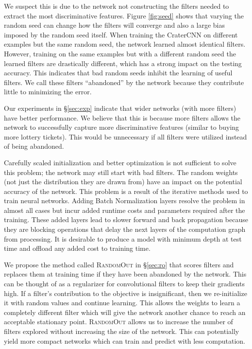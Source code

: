 \documentclass{article}
\begin{document}
We suspect this is due to the network not constructing the filters needed to extract the most discriminative features. Figure \ref{fig:seed} shows that varying the random seed can change how the filters will converge and also a large bias imposed by the random seed itself. When training the CraterCNN on different examples but the same random seed, the network learned almost identical filters. However, training on the same examples but with a different random seed the learned filters are drastically different, which has a strong impact on the testing accuracy.  This indicates that bad random seeds inhibit the learning of useful filters.  We call these filters ``abandoned'' by the network because they contribute little to minimizing the error. 


Our experiments in \S \ref{sec:exp} indicate that wider networks (with more filters) have better performance. We believe that this is because more filters allows the network to successfully capture more discriminative features (similar to buying more lottery tickets). This would be unnecessary if all filters were utilized instead of being abandoned.
	
	


Carefully scaled initialization \cite{glorot_understanding_2010} and better optimization is not sufficient to solve this problem; the network may still start with bad filters. The random weights (not just the distribution they are drawn from) have an impact on the potential accuracy of the network. This problem is a result of the iterative methods used to train neural networks. Adding Batch Normalization \cite{Ioffe2015} layers resolve the problem in almost all cases but incur added runtime costs and parameters required after the training. These added layers lead to slower forward and back propagation because they are blocking operations that delay the next layers of the computation graph from processing. It is desirable to produce a model with minimum depth at test time and offload any added cost to training time.

We propose the method called \textsc{RandomOut} in \S \ref{sec:ro} that scores filters and replaces them at training time if they have been abandoned by the network. This can be thought of as a regularizer for convolutional filters to keep their gradients high. If a filter's contribution to the objective is insignificant, then we re-initialize it with random values and continue learning. This allows the weights to learn a completely different filter which will give the network another chance to reach an acceptable stationary point. \textsc{RandomOut} allows us to increase the number of filters explored without increasing the size of the network. This can potentially yield more compact networks which can train and predict with less computation.
\end{document}
